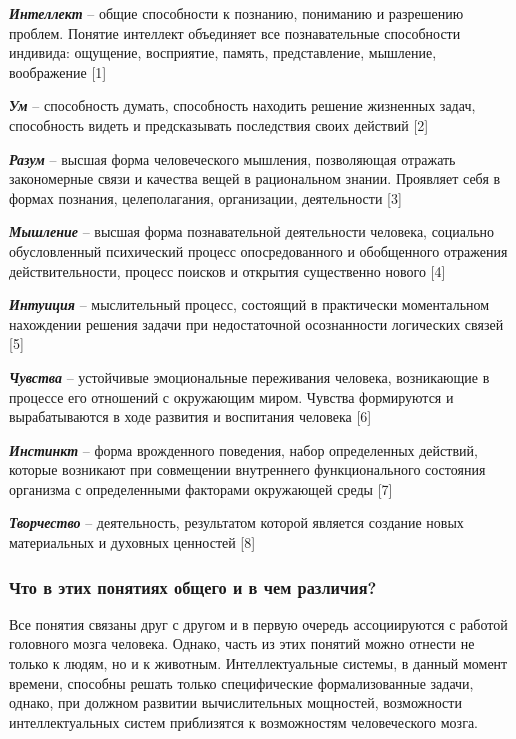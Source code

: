 \documentclass[14pt,a4paper,report]{report}
\begin{document}
\emph{\textbf{Интеллект}} -- общие способности к познанию, пониманию и разрешению проблем. Понятие интеллект объединяет все познавательные способности индивида: ощущение, восприятие, память, представление, мышление, воображение [1]

\emph{\textbf{Ум}} -- способность думать, способность находить решение жизненных задач, способность видеть и предсказывать последствия своих действий [2]

\emph{\textbf{Разум}} -- высшая форма человеческого мышления, позволяющая отражать закономерные связи и качества вещей в рациональном знании. Проявляет себя в формах познания, целеполагания, организации, деятельности [3]

\emph{\textbf{Мышление}} -- высшая форма познавательной деятельности человека, социально обусловленный психический процесс опосредованного и обобщенного отражения действительности, процесс поисков и открытия существенно нового [4]

\emph{\textbf{Интуиция}} -- мыслительный процесс, состоящий в практически моментальном нахождении решения задачи при недостаточной осознанности логических связей [5]

\emph{\textbf{Чувства}} -- устойчивые эмоциональные переживания человека, возникающие в процессе его отношений с окружающим миром. Чувства формируются и вырабатываются в ходе развития и воспитания человека [6]

\emph{\textbf{Инстинкт}} -- форма врожденного поведения, набор определенных действий, которые возникают при совмещении внутреннего функционального состояния организма с определенными факторами окружающей среды [7]

\emph{\textbf{Творчество}} -- деятельность, результатом которой является создание новых материальных и духовных ценностей [8]

\subsubsection{Что в этих понятиях общего и в чем различия?}

Все понятия связаны друг с другом и в первую очередь ассоциируются с работой головного мозга человека. Однако, часть из этих понятий можно отнести не только к людям, но и к животным. Интеллектуальные системы, в данный момент времени, способны решать только специфические формализованные задачи, однако, при должном развитии вычислительных мощностей, возможности интеллектуальных систем приблизятся к возможностям человеческого мозга.
\end{document}
